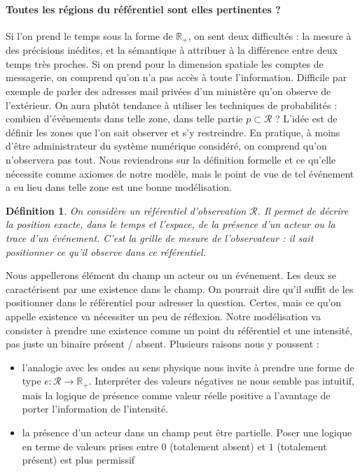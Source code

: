 \documentclass[11pt]{article}
\newtheorem{definition}{Définition}[section]
\begin{document}
			\paragraph{Toutes les régions du référentiel sont elles pertinentes ?} Si l'on prend le temps sous la forme de $\mathbb{R}_+$, on sent deux difficultés : la mesure à des précisions inédites, et la sémantique à attribuer à la différence entre deux temps très proches. Si on prend pour la dimension spatiale les comptes de messagerie, on comprend qu'on n'a pas accès à toute l'information. Difficile par exemple de parler des adresses mail privées d'un ministère qu'on observe de l'extérieur. On aura plutôt tendance à utiliser les techniques de probabilités : combien d'événements dans telle zone, dans telle partie $p \subset \mathcal{R}$ ? L'idée est de définir les zones que l'on sait observer et s'y restreindre. En pratique, à moins d'être administrateur du système numérique considéré, on comprend qu'on n'observera pas tout.  Nous reviendrons sur la définition formelle et ce qu'elle nécessite comme axiomes de notre modèle, mais le point de vue de \og{}tel événement a eu lieu dans telle zone\fg{} est une bonne modélisation. 
			
			\begin{definition}
				On considère un référentiel d'observation $\mathcal{R}$. Il permet de décrire la position exacte, dans le temps et l'espace, de la présence d'un acteur ou la trace d'un événement. C'est la grille de mesure de l'observateur : il sait positionner ce qu'il observe dans ce référentiel. 
			\end{definition}
			
			
			\vspace{0.5cm}
			Nous appellerons élément du champ un acteur ou un événement. Les deux se caractérisent par une existence dans le champ. On pourrait dire qu'il suffit de les positionner dans le référentiel pour adresser la question. Certes, mais ce qu'on appelle existence va nécessiter un peu de réflexion. Notre modélisation va consister à prendre une existence comme un point du référentiel et une intensité, pas juste un binaire \og{}présent / absent\fg{}. Plusieurs raisons nous y poussent : 
			\begin{itemize}
				\item l'analogie avec les ondes au sens physique nous invite à prendre une forme de type $e : \mathcal{R} \rightarrow \mathbb{R}_+$. Interpréter des valeurs négatives ne nous semble pas intuitif, mais la logique de présence comme valeur réelle positive a l'avantage de porter l'information de l'intensité. 
				\item la présence d'un acteur dans un champ peut être partielle. Poser une logique en terme de valeurs prises entre $0$ (totalement absent) et $1$ (totalement présent) est plus permissif
			\end{itemize}
			
\end{document}
